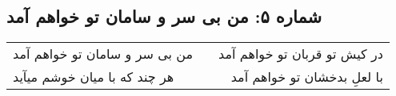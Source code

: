 \begin{center}
\section*{شماره ۵: من بی سر و سامان تو خواهم آمد}
\label{sec:005}
\begin{longtable}{l p{0.5cm} r}
من بی سر و سامان تو خواهم آمد
&&
در کیش تو قربان تو خواهم آمد
\\
هر چند که با میان خوشم میآید
&&
با لعلِ بدخشان تو خواهم آمد
\\
\end{longtable}
\end{center}
